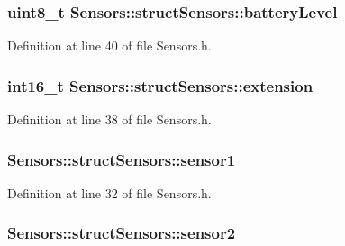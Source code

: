 \subsubsection[{\texorpdfstring{battery\+Level}{batteryLevel}}]{\setlength{\rightskip}{0pt plus 5cm}uint8\+\_\+t Sensors\+::struct\+Sensors\+::battery\+Level}\hypertarget{struct_sensors_1_1struct_sensors_a11658e45b96b1e9dc746562585fe8aa0}{}\label{struct_sensors_1_1struct_sensors_a11658e45b96b1e9dc746562585fe8aa0}


Definition at line 40 of file Sensors.\+h.

\subsubsection[{\texorpdfstring{extension}{extension}}]{\setlength{\rightskip}{0pt plus 5cm}int16\+\_\+t Sensors\+::struct\+Sensors\+::extension}\hypertarget{struct_sensors_1_1struct_sensors_a11872d348bb506ddb714386c7897b120}{}\label{struct_sensors_1_1struct_sensors_a11872d348bb506ddb714386c7897b120}


Definition at line 38 of file Sensors.\+h.

\subsubsection[{\texorpdfstring{sensor1}{sensor1}}]{ Sensors\+::struct\+Sensors\+::sensor1}\hypertarget{struct_sensors_1_1struct_sensors_a66081d2159f5f6025ec91d1ca0b5f929}{}\label{struct_sensors_1_1struct_sensors_a66081d2159f5f6025ec91d1ca0b5f929}


Definition at line 32 of file Sensors.\+h.

\subsubsection[{\texorpdfstring{sensor2}{sensor2}}]{ Sensors\+::struct\+Sensors\+::sensor2}\hypertarget{struct_sensors_1_1struct_sensors_ac5e48ff6594a92be5bafad0fd1c2a1b7}{}\label{struct_sensors_1_1struct_sensors_ac5e48ff6594a92be5bafad0fd1c2a1b7}


